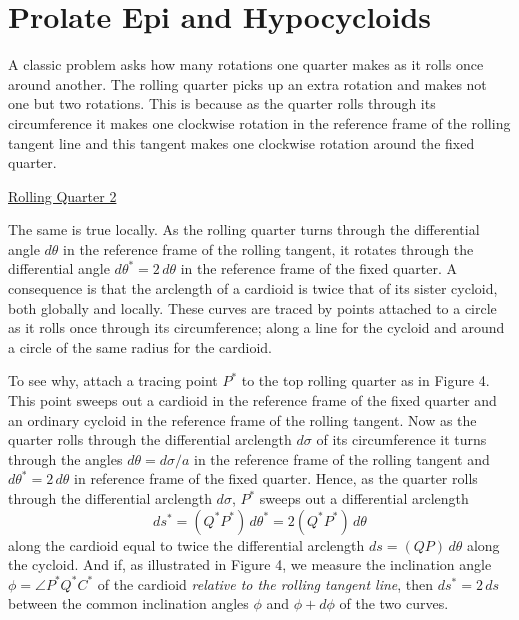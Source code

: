 \documentclass{ximera}
\begin{document}
\section{Prolate Epi and Hypocycloids}
A classic problem asks how many rotations one quarter makes as it rolls once around another. The rolling quarter picks up an extra rotation and makes not one but two rotations. This is because as the quarter rolls through its circumference it makes one clockwise rotation in the reference frame of the rolling tangent line and this tangent makes one clockwise rotation around the fixed quarter.



\begin{onlineOnly}
    \begin{center}
\end{center}
\end{onlineOnly}

\href{https://www.desmos.com/calculator/0dlaaalmjl}{Rolling Quarter 2}



The same is true locally. As the rolling quarter turns through the differential angle $d\theta$ in the reference frame of the rolling tangent, it rotates through the differential angle $d\theta^* = 2\, d\theta$ in the reference frame of the fixed quarter. A consequence is that the arclength of a cardioid is twice that of its sister cycloid, both globally and locally. These curves are traced by points attached to a circle as it rolls once through its circumference; along a line for the cycloid and around a circle of the same radius for the cardioid.  

To see why, attach a tracing point $P^*$ to the top rolling quarter as in Figure 4. This point sweeps out a cardioid in the reference frame of the fixed quarter and an ordinary cycloid in the reference frame of the rolling tangent. Now as the quarter rolls through the differential arclength $d\sigma$ of its circumference it turns through the angles $d\theta = d\sigma/a$ in the reference frame of the rolling tangent and $d\theta^* = 2\, d\theta$ in reference frame of the fixed quarter. Hence, as the quarter rolls through the differential arclength $d\sigma$, $P^*$ sweeps out a differential arclength
\[
  ds^* = (Q^*P^*)\, d\theta^* =  2(Q^*P^*) \, d\theta  %
\]
along the cardioid equal to twice the differential arclength $ds = (QP)\, d\theta$ along the cycloid. And if, as illustrated in Figure 4, we measure the inclination angle $\phi = \angle P^*Q^*C^*$ of the cardioid \emph{relative to the rolling tangent line}, then $ds^* = 2\, ds$ between the common inclination angles $\phi$ and $\phi + d\phi$ of the two curves.
\end{document}
